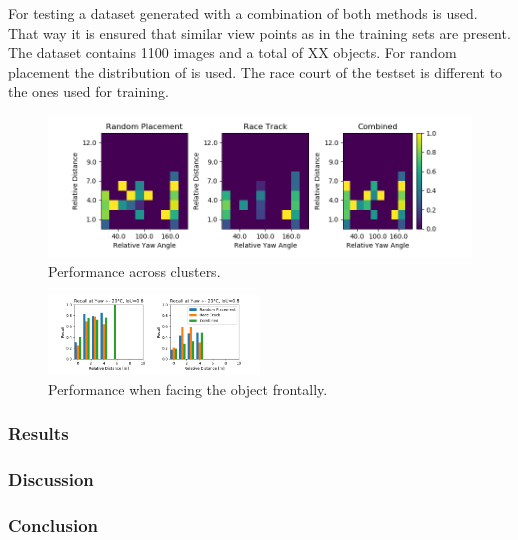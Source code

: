 	For testing a dataset generated with a combination of both methods is used. That way it is ensured that similar view points as in the training sets are present. The dataset contains 1100 images and a total of XX objects. For random placement the distribution of  is used. The race court of the testset is different to the ones used for training. 
	
	\begin{figure}
		\includegraphics[width=\textwidth]{fig/recall_yaw}
		\caption{Performance across clusters.}
		\label{fig:recall_yaw}
	\end{figure}
	\begin{figure}
		\centering
		\includegraphics[width=0.5\textwidth]{fig/recall_front}
		\caption{Performance when facing the object frontally.}
		\label{fig:recall_front}
	\end{figure}
	
	
	\subsubsection{Results}
	
	
	\subsubsection{Discussion}
	
	\subsubsection{Conclusion}
	